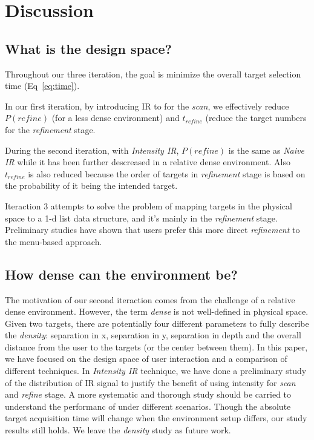 \section{Discussion}
\label{sec:discussion}

\subsection{What is the design space?}
\label{sec:what-design-space}
Throughout our three iteration, the goal is minimize the overall target selection time (Eq~\ref{eq:time}).

In our first iteration, by introducing IR to for the {\em scan}, we effectively reduce $P(refine)$ (for a less dense environment) and $t_{refine}$ (reduce the target numbers for the {\em refinement} stage. 

During the second iteration, with {\em Intensity IR}, $P(refine)$ is the same as {\em Naive IR} while it has been further descreased in a relative dense environment. Also $t_{refine}$ is also reduced because the order of targets in {\em refinement} stage is based on the probability of it being the intended target. 

Iteraction 3 attempts to solve the problem of mapping targets in the physical space to a 1-d list data structure, and it's mainly in the {\em refinement} stage. Preliminary studies have shown that users prefer this more direct {\em refinement} to the menu-based approach. 


\subsection{How dense can the environment be?}
\label{sec:how-dense-can}
The motivation of our second iteraction comes from the challenge of a relative dense environment. However, the term {\it dense} is not well-defined in physical space. Given two targets, there are potentially four different parameters to fully describe the {\it density}: separation in x, separation in y, separation in depth and the overall distance from the user to the targets (or the center between them). In this paper, we have focused on the design space of user interaction and a comparison of different techniques. In {\em Intensity IR} technique, we have done a preliminary study of the distribution of IR signal to justify the benefit of using intensity for {\em scan} and  {\em refine} stage. A more systematic and thorough study should be carried to understand the performanc of \systemnamenospace under different scenarios. Though the absolute target acquisition time will change when the environment setup differs, our study results still holds. We leave the {\em density} study as future work.  


